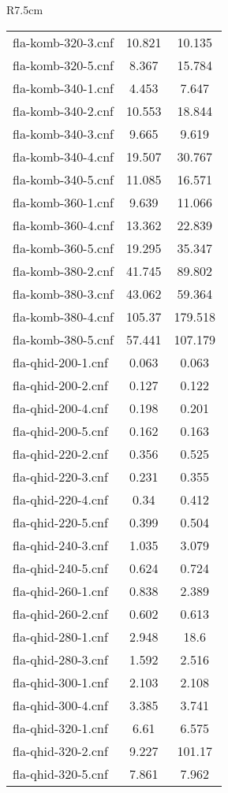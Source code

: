 \begin{wraptable}[29]{R}{7.5cm}
\begin{tabular}{l| c c }
fla-komb-320-3.cnf & 10.821 & 10.135 \\
fla-komb-320-5.cnf & 8.367 & 15.784 \\
fla-komb-340-1.cnf & 4.453 & 7.647 \\
fla-komb-340-2.cnf & 10.553 & 18.844 \\
fla-komb-340-3.cnf & 9.665 & 9.619 \\
fla-komb-340-4.cnf & 19.507 & 30.767 \\
fla-komb-340-5.cnf & 11.085 & 16.571 \\
fla-komb-360-1.cnf & 9.639 & 11.066 \\
fla-komb-360-4.cnf & 13.362 & 22.839 \\
fla-komb-360-5.cnf & 19.295 & 35.347 \\
fla-komb-380-2.cnf & 41.745 & 89.802 \\
fla-komb-380-3.cnf & 43.062 & 59.364 \\
fla-komb-380-4.cnf & 105.37 & 179.518 \\
fla-komb-380-5.cnf & 57.441 & 107.179 \\
fla-qhid-200-1.cnf & 0.063 & 0.063 \\
fla-qhid-200-2.cnf & 0.127 & 0.122 \\
fla-qhid-200-4.cnf & 0.198 & 0.201 \\
fla-qhid-200-5.cnf & 0.162 & 0.163 \\
fla-qhid-220-2.cnf & 0.356 & 0.525 \\
fla-qhid-220-3.cnf & 0.231 & 0.355 \\
fla-qhid-220-4.cnf & 0.34 & 0.412 \\
fla-qhid-220-5.cnf & 0.399 & 0.504 \\
fla-qhid-240-3.cnf & 1.035 & 3.079 \\
fla-qhid-240-5.cnf & 0.624 & 0.724 \\
fla-qhid-260-1.cnf & 0.838 & 2.389 \\
fla-qhid-260-2.cnf & 0.602 & 0.613 \\
fla-qhid-280-1.cnf & 2.948 & 18.6 \\
fla-qhid-280-3.cnf & 1.592 & 2.516 \\
fla-qhid-300-1.cnf & 2.103 & 2.108 \\
fla-qhid-300-4.cnf & 3.385 & 3.741 \\
\fi
fla-qhid-320-1.cnf & 6.61 & 6.575 \\
fla-qhid-320-2.cnf & 9.227 & 101.17 \\
fla-qhid-320-5.cnf & 7.861 & 7.962 \\

\end{tabular}
\end{wraptable}
